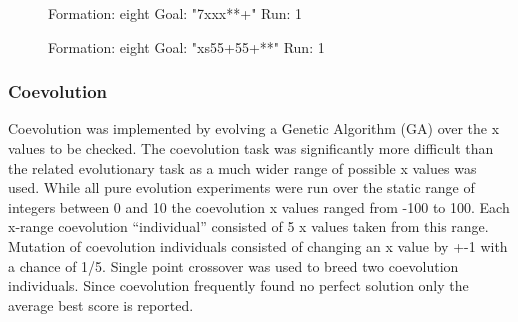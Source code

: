 \documentclass[11pt]{article}
\begin{document}
\begin{itemize}
  \begin{figure}
  \centering
  \caption{Formation: eight Goal: "7xxx**+" Run: 1}
  \end{figure}


  \begin{figure}
  \centering
  \caption{Formation: eight Goal: "xs55+55+**" Run: 1}
  \end{figure}


\end{itemize} %
\subsubsection*{Coevolution}
\label{sec-1.5.4}

Coevolution was implemented by evolving a Genetic Algorithm (GA) over
the x values to be checked.  The coevolution task was significantly
more difficult than the related evolutionary task as a much wider
range of possible x values was used.  While all pure evolution
experiments were run over the static range of integers between 0 and
10 the coevolution x values ranged from -100 to 100.  Each x-range
coevolution ``individual'' consisted of 5 x values taken from this
range.  Mutation of coevolution individuals consisted of changing an x
value by +-1 with a chance of 1/5.  Single point crossover was used to
breed two coevolution individuals.  Since coevolution frequently found
no perfect solution only the average best score is reported.
\end{document}
